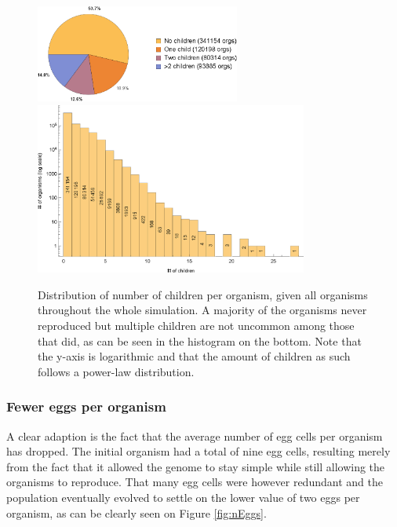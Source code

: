 \begin{figure}
  \begin{center}
  
  \includegraphics[width=0.6\textwidth]{figure/nChildrenPie}
  \includegraphics[width=0.8\textwidth]{figure/nChildrenHistogram}
  \caption{
    Distribution of number of children per organism, given all organisms throughout the whole simulation. A majority of the organisms never reproduced but multiple children are not uncommon among those that did, as can be seen in the histogram on the bottom. Note that the y-axis is logarithmic and that the amount of children as such follows a power-law distribution.
  }
  \label{fig:numberOfChildren}
  \end{center}
\end{figure}

\subsubsection{Fewer eggs per organism}
A clear adaption is the fact that the average number of egg cells per organism has dropped. The initial organism had a total of nine egg cells, resulting merely from the fact that it allowed the genome to stay simple while still allowing the organisms to reproduce. That many egg cells were however redundant and the population eventually evolved to settle on the lower value of two eggs per organism, as can be clearly seen on Figure \ref{fig:nEggs}. 

